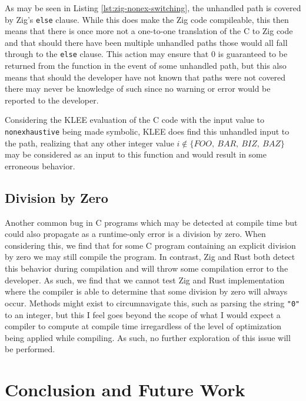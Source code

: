 \documentclass[conference]{IEEEtran}
\begin{document}
As may be seen in Listing \ref{lst:zig-nonex-switching}, the unhandled path is covered by Zig's
\texttt{else} clause. While this does make the Zig code compileable, this then means that there
is once more not a one-to-one translation of the C to Zig code and that should there have been
multiple unhandled paths those would all fall through to the \texttt{else} clause. This action
may ensure that 0 is guaranteed to be returned from the function in the event of some unhandled
path, but this also means that should the developer have not known that paths were not covered
there may never be knowledge of such since no warning or error would be reported to the
developer.

Considering the KLEE evaluation of the C code with the input value to \texttt{nonexhaustive}
being made symbolic, KLEE does find this unhandled input to the path, realizing that any other
integer value $i\notin\{FOO,\ BAR,\ BIZ,\ BAZ\}$ may be considered as an input to this function
and would result in some erroneous behavior.


\subsection{Division by Zero}
Another common bug in C programs which may be detected at compile time but could also propagate
as a runtime-only error is a division by zero. When considering this, we find that for some C
program containing an explicit division by zero we may still compile the program. In contrast,
Zig and Rust both detect this behavior during compilation and will throw some compilation error
to the developer. As such, we find that we cannot test Zig and Rust implementation where the
compiler is able to determine that some division by zero will always occur. Methods might exist
to circumnavigate this, such as parsing the string \texttt{"0"} to an integer, but this I feel
goes beyond the scope of what I would expect a compiler to compute at compile time irregardless
of the level of optimization being applied while compiling. As such, no further exploration of
this issue will be performed.


\section{Conclusion and Future Work}




\end{document}

